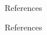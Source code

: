 \begin{frame}{References}
  \begin{block}{References}
    \printbibliography[heading=none]
  \end{block}
\end{frame}
%
